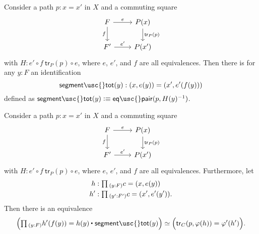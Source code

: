   \begin{defn}
    Consider a path $p:x=x'$ in $X$ and a commuting square
    \begin{equation*}
      \begin{tikzcd}
        F \arrow[r,"e"] \arrow[d,swap,"f"] & P(x) \arrow[d,"\mathsf{tr}_P(p)"] \\
        F' \arrow[r,"{e'}"] & P(x')
      \end{tikzcd}
    \end{equation*}
    with $H:e'\circ f ~ \mathsf{tr}_P(p)\circ e$, where $e$, $e'$, and $f$ are all equivalences. Then there is for any $y:F$ an identification
    \begin{equation*}
      \mathsf{segment\usc{}tot}(y):(x,e(y))=(x',e'(f(y)))
    \end{equation*}
    defined as $\mathsf{segment\usc{}tot}(y)\defeq\mathsf{eq\usc{}pair}(p,H(y)^{-1})$.
  \end{defn}

  \begin{lem}\label{lem:compute-tr-contraction}
    Consider a path $p:x=x'$ in $X$ and a commuting square
    \begin{equation*}
      \begin{tikzcd}
        F \arrow[r,"e"] \arrow[d,swap,"f"] & P(x) \arrow[d,"\mathsf{tr}_P(p)"] \\
        F' \arrow[r,"{e'}"] & P(x')
      \end{tikzcd}
    \end{equation*}
    with $H:e'\circ f ~ \mathsf{tr}_P(p)\circ e$, where $e$, $e'$, and $f$ are all equivalences. Furthermore, let
    \begin{align*}
      h & : \prd{y:F}c=(x,e(y)) \\
      h' & : \prd{y':F'}c=(x',e'(y')).
    \end{align*}
    Then there is an equivalence
    \begin{equation*}
      \Big(\prd{y:F} h'(f(y))=\ct{h(y)}{\mathsf{segment\usc{}tot}(y)}\Big)
      \simeq \Big(\mathsf{tr}_C(p,\varphi(h))= \varphi'(h')\Big).
    \end{equation*}
  \end{lem}

